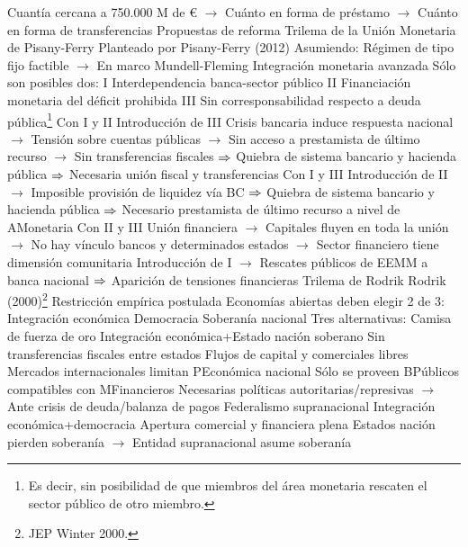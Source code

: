 \documentclass{nuevotema}
\begin{document}
\begin{esquemal}
				\4[] Cuantía cercana a 750.000 M de €
				\4[] $\to$ Cuánto en forma de préstamo
				\4[] $\to$ Cuánto en forma de transferencias
		\2 Propuestas de reforma
			\3 Trilema de la Unión Monetaria de Pisany-Ferry
				\4 Planteado por Pisany-Ferry (2012)
				\4 Asumiendo:
				\4[] Régimen de tipo fijo factible
				\4[] $\to$ En marco Mundell-Fleming
				\4[] Integración monetaria avanzada
				\4 Sólo son posibles dos:
				\4[] \textsc{I} Interdependencia banca-sector público
				\4[] \textsc{II} Financiación monetaria del déficit prohibida
				\4[] \textsc{III} Sin corresponsabilidad respecto a deuda pública\footnote{Es decir, sin posibilidad de que miembros del área monetaria rescaten el sector público de otro miembro.}
				\4 Con I y II
				\4[] Introducción de III
				\4[] Crisis bancaria induce respuesta nacional
				\4[] $\to$ Tensión sobre cuentas públicas
				\4[] $\to$ Sin acceso a prestamista de último recurso
				\4[] $\to$ Sin transferencias fiscales
				\4[] $\Rightarrow$ Quiebra de sistema bancario y hacienda pública
				\4[] $\Rightarrow$ Necesaria unión fiscal y transferencias
				\4 Con I y III
				\4[] Introducción de II
				\4[] $\to$ Imposible provisión de liquidez vía BC
				\4[] $\Rightarrow$ Quiebra de sistema bancario y hacienda pública
				\4[] $\Rightarrow$ Necesario prestamista de último recurso a nivel de AMonetaria
				\4 Con II y III
				\4[] Unión financiera
				\4[] $\to$ Capitales fluyen en toda la unión
				\4[] $\to$ No hay vínculo bancos y determinados estados
				\4[] $\to$ Sector financiero tiene dimensión comunitaria
				\4[] Introducción de I
				\4[] $\to$ Rescates públicos de EEMM a banca nacional
				\4[] $\Rightarrow$ Aparición de tensiones financieras
			\3 Trilema de Rodrik
				\4 Rodrik (2000)\footnote{JEP Winter 2000.}
				\4 Restricción empírica postulada
				\4 Economías abiertas deben elegir 2 de 3:
				\4[I] Integración económica
				\4[II] Democracia
				\4[III] Soberanía nacional
				\4 Tres alternativas:
				\4[A] Camisa de fuerza de oro
				\4[] Integración económica+Estado nación soberano
				\4[] Sin transferencias fiscales entre estados
				\4[] Flujos de capital y comerciales libres
				\4[] Mercados internacionales limitan PEconómica nacional
				\4[] Sólo se proveen BPúblicos compatibles con MFinancieros
				\4[] Necesarias políticas autoritarias/represivas
				\4[] $\to$ Ante crisis de deuda/balanza de pagos
				\4[B] Federalismo supranacional
				\4[] Integración económica+democracia
				\4[] Apertura comercial y financiera plena
				\4[] Estados nación pierden soberanía
				\4[] $\to$ Entidad supranacional asume soberanía

\end{esquemal}
\end{document}
